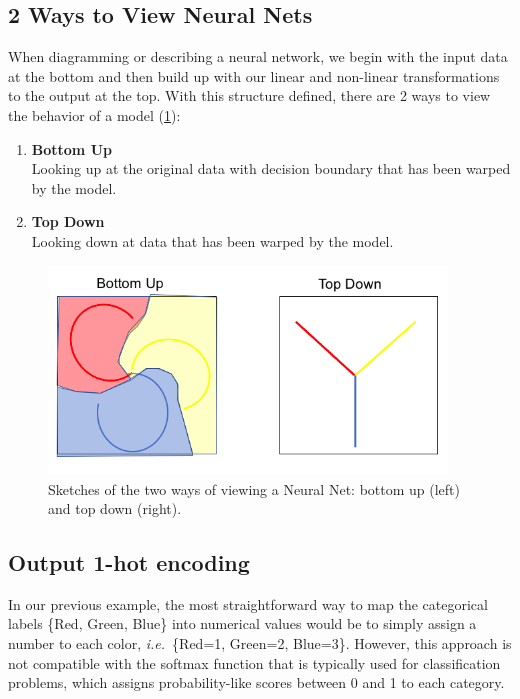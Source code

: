 \subsection{2 Ways to View Neural Nets}
When diagramming or describing a neural network, we begin with the input data at the bottom and then build up with our linear and non-linear transformations to the output at the top. With this structure defined, there are 2 ways to view the behavior of a model (\cref{fig:views}):\\

\begin{enumerate}
    \item \textbf{Bottom Up}\\
    Looking up at the original data with decision boundary that has been warped by the model.
    \item \textbf{Top Down}\\
    Looking down at data that has been warped by the model.
\end{enumerate}

\begin{figure}[ht]
    \centering
    \includegraphics[width=300pt]{figs/views.png}
    \caption{Sketches of the two ways of viewing a Neural Net: bottom up (left) and top down (right).}
    \label{fig:views}
\end{figure}

\subsection{Output 1-hot encoding} \label{ssc:1hot}
In our previous example, the most straightforward way to map the categorical labels \{Red, Green, Blue\} into numerical values would be to simply assign a number to each color, \emph{i.e.}\ \{Red=1, Green=2, Blue=3\}.
However, this approach is not compatible with the softmax function that is typically used for classification problems, which assigns probability-like scores between 0 and 1 to each category. 

